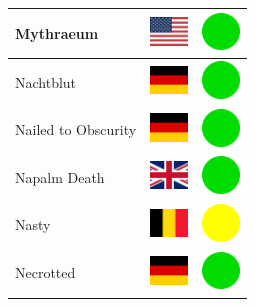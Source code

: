 \documentclass[12pt, a4paper, twoside]{report}
\begin{document}
\begin{center}
\begin{longtable}{|p{5cm}|p{2cm}|p{2cm}|}
			Mythraeum & \includegraphics[width=1cm]{4x3/us} & \includegraphics[width=1cm]{likes/y} \\ \hline
			Nachtblut & \includegraphics[width=1cm]{4x3/de} & \includegraphics[width=1cm]{likes/y} \\ \hline
			Nailed to Obscurity & \includegraphics[width=1cm]{4x3/de} & \includegraphics[width=1cm]{likes/y} \\ \hline
			Napalm Death & \includegraphics[width=1cm]{4x3/gb} & \includegraphics[width=1cm]{likes/y} \\ \hline
			Nasty & \includegraphics[width=1cm]{4x3/be} & \includegraphics[width=1cm]{likes/m} \\ \hline
			Necrotted & \includegraphics[width=1cm]{4x3/de} & \includegraphics[width=1cm]{likes/y} \\ \hline

\end{longtable}
\end{center}
\end{document}
